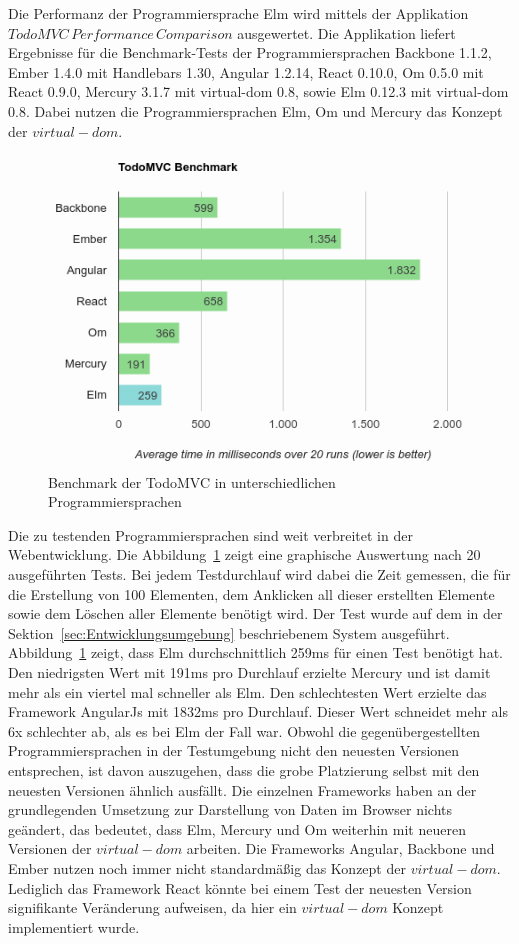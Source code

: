 Die Performanz der Programmiersprache Elm wird mittels der Applikation $TodoMVC\,Performance\,Comparison$ ausgewertet. Die Applikation liefert Ergebnisse für die Benchmark-Tests der Programmiersprachen Backbone 1.1.2, Ember 1.4.0 mit Handlebars 1.30, Angular 1.2.14, React 0.10.0, Om 0.5.0 mit React 0.9.0, Mercury 3.1.7 mit virtual-dom 0.8, sowie Elm 0.12.3 mit virtual-dom 0.8. Dabei nutzen die Programmiersprachen Elm, Om und Mercury das Konzept der $virtual-dom$.
\begin{figure}[ht]
\centering
\includegraphics[scale=0.6]{img/elm-benchmark-final.png}
\caption{Benchmark der TodoMVC in unterschiedlichen Programmiersprachen}\label{fig:elm-todo-benchmarks}
\end{figure}
Die zu testenden Programmiersprachen sind weit verbreitet in der Webentwicklung. Die Abbildung~\ref{fig:elm-todo-benchmarks} zeigt eine graphische Auswertung nach 20 ausgeführten Tests. Bei jedem Testdurchlauf wird dabei die Zeit gemessen, die für die Erstellung von 100 Elementen, dem Anklicken all dieser erstellten Elemente sowie dem Löschen aller Elemente benötigt wird. Der Test wurde auf dem in der Sektion~\ref{sec:Entwicklungsumgebung} beschriebenem System ausgeführt. Abbildung~\ref{fig:elm-todo-benchmarks} zeigt, dass Elm durchschnittlich 259ms für einen Test benötigt hat. Den niedrigsten Wert mit 191ms pro Durchlauf erzielte Mercury und ist damit mehr als ein viertel mal schneller als Elm. Den schlechtesten Wert erzielte das Framework AngularJs mit 1832ms pro Durchlauf. Dieser Wert schneidet mehr als 6x schlechter ab, als es bei Elm der Fall war.
Obwohl die gegenübergestellten Programmiersprachen in der Testumgebung nicht den neuesten Versionen entsprechen, ist davon auszugehen, dass die grobe Platzierung selbst mit den neuesten Versionen ähnlich ausfällt. Die einzelnen Frameworks haben an der grundlegenden Umsetzung zur Darstellung von Daten im Browser nichts geändert, das bedeutet, dass Elm, Mercury und Om weiterhin mit neueren Versionen der $virtual-dom$ arbeiten. Die Frameworks Angular, Backbone und Ember nutzen noch immer nicht standardmäßig das Konzept der $virtual-dom$. Lediglich das Framework React könnte bei einem Test der neuesten Version signifikante Veränderung aufweisen, da hier ein $virtual-dom$ Konzept implementiert wurde.
